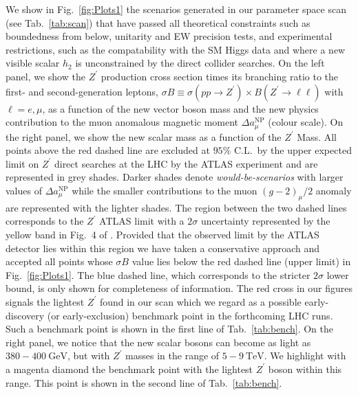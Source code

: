 We show in Fig.~\ref{fig:Plots1} the scenarios generated in our parameter space scan (see Tab.~\ref{tab:scan}) that have passed all theoretical constraints such as boundedness from below, unitarity and EW precision tests, and experimental restrictions, such as the compatability with the SM Higgs data and where a new visible scalar $h_2$ is unconstrained by the direct collider searches.
%
On the left panel, we show the $Z^\prime$ production cross section times its branching ratio to the first- and second-generation leptons, $\sigma B \equiv \sigma \left( pp \to Z^\prime \right) \times B \left( Z^\prime \to \ell \ell \right) $ with $\ell = e,\mu$, as a function of the new vector boson mass and the new physics contribution to the muon anomalous magnetic moment $\Delta a^{\textrm{NP}}_\mu$ (colour scale). 
%
On the right panel, we show the new scalar mass as a function of the $Z^\prime$ Mass. 
%
All points above the red dashed line are excluded at $95\%$ C.L.~by the upper expected limit on $Z^\prime$ direct searches at the LHC by the ATLAS experiment and are represented in grey shades. 
%
Darker shades denote \textit{would-be-scenarios} with larger values of $\Delta a^{\textrm{NP}}_\mu$ while the smaller contributions to the muon $\left(g-2\right)_\mu / 2$ anomaly are represented with the lighter shades. 
%
The region between the two dashed lines corresponds to the $Z^\prime$ ATLAS limit with a $2\sigma$ uncertainty represented by the yellow band in Fig.~4 of \cite{Aaboud:2017buh}.
%
Provided that the observed limit by the ATLAS detector lies within this region we have taken a conservative approach and accepted all points whose $\sigma B$ value lies below the red dashed line (upper limit) in Fig.~\ref{fig:Plots1}.
%
The blue dashed line, which corresponds to the stricter $2 \sigma$ lower bound, is only shown for completeness of information. The red cross in our figures signals the lightest $Z^\prime$ found in our scan which we regard as a possible early-discovery (or early-exclusion) benchmark point in the forthcoming LHC runs. Such a benchmark point is shown in the first line of Tab.~\ref{tab:bench}.
%
On the right panel, we notice that the new scalar bosons can become as light as $380 - 400~\textrm{GeV}$, but with $Z^\prime$ masses in the range of $5 - 9~\textrm{TeV}$. We highlight with a magenta diamond the benchmark point with the lightest $Z^\prime$ boson within this range. 
%
This point is shown in the second line of Tab.~\ref{tab:bench}.
%
